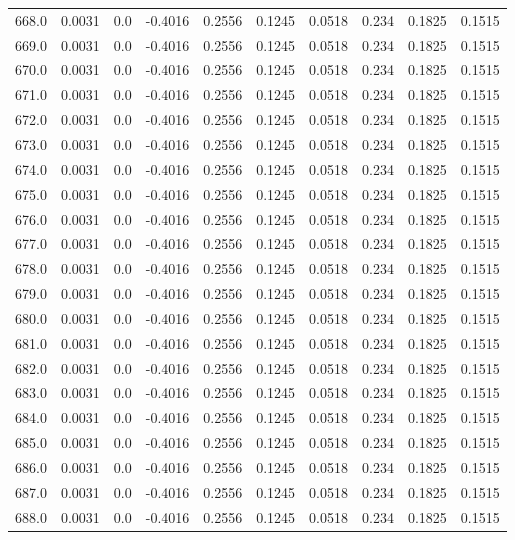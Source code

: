 \begin{longtable}{lrrrrrrrrr}
668.0 & 0.0031 & 0.0 & -0.4016 & 0.2556 & 0.1245 & 0.0518 & 0.234 & 0.1825 & 0.1515 \\
669.0 & 0.0031 & 0.0 & -0.4016 & 0.2556 & 0.1245 & 0.0518 & 0.234 & 0.1825 & 0.1515 \\
670.0 & 0.0031 & 0.0 & -0.4016 & 0.2556 & 0.1245 & 0.0518 & 0.234 & 0.1825 & 0.1515 \\
671.0 & 0.0031 & 0.0 & -0.4016 & 0.2556 & 0.1245 & 0.0518 & 0.234 & 0.1825 & 0.1515 \\
672.0 & 0.0031 & 0.0 & -0.4016 & 0.2556 & 0.1245 & 0.0518 & 0.234 & 0.1825 & 0.1515 \\
673.0 & 0.0031 & 0.0 & -0.4016 & 0.2556 & 0.1245 & 0.0518 & 0.234 & 0.1825 & 0.1515 \\
674.0 & 0.0031 & 0.0 & -0.4016 & 0.2556 & 0.1245 & 0.0518 & 0.234 & 0.1825 & 0.1515 \\
675.0 & 0.0031 & 0.0 & -0.4016 & 0.2556 & 0.1245 & 0.0518 & 0.234 & 0.1825 & 0.1515 \\
676.0 & 0.0031 & 0.0 & -0.4016 & 0.2556 & 0.1245 & 0.0518 & 0.234 & 0.1825 & 0.1515 \\
677.0 & 0.0031 & 0.0 & -0.4016 & 0.2556 & 0.1245 & 0.0518 & 0.234 & 0.1825 & 0.1515 \\
678.0 & 0.0031 & 0.0 & -0.4016 & 0.2556 & 0.1245 & 0.0518 & 0.234 & 0.1825 & 0.1515 \\
679.0 & 0.0031 & 0.0 & -0.4016 & 0.2556 & 0.1245 & 0.0518 & 0.234 & 0.1825 & 0.1515 \\
680.0 & 0.0031 & 0.0 & -0.4016 & 0.2556 & 0.1245 & 0.0518 & 0.234 & 0.1825 & 0.1515 \\
681.0 & 0.0031 & 0.0 & -0.4016 & 0.2556 & 0.1245 & 0.0518 & 0.234 & 0.1825 & 0.1515 \\
682.0 & 0.0031 & 0.0 & -0.4016 & 0.2556 & 0.1245 & 0.0518 & 0.234 & 0.1825 & 0.1515 \\
683.0 & 0.0031 & 0.0 & -0.4016 & 0.2556 & 0.1245 & 0.0518 & 0.234 & 0.1825 & 0.1515 \\
684.0 & 0.0031 & 0.0 & -0.4016 & 0.2556 & 0.1245 & 0.0518 & 0.234 & 0.1825 & 0.1515 \\
685.0 & 0.0031 & 0.0 & -0.4016 & 0.2556 & 0.1245 & 0.0518 & 0.234 & 0.1825 & 0.1515 \\
686.0 & 0.0031 & 0.0 & -0.4016 & 0.2556 & 0.1245 & 0.0518 & 0.234 & 0.1825 & 0.1515 \\
687.0 & 0.0031 & 0.0 & -0.4016 & 0.2556 & 0.1245 & 0.0518 & 0.234 & 0.1825 & 0.1515 \\
688.0 & 0.0031 & 0.0 & -0.4016 & 0.2556 & 0.1245 & 0.0518 & 0.234 & 0.1825 & 0.1515 \\

\end{longtable}
